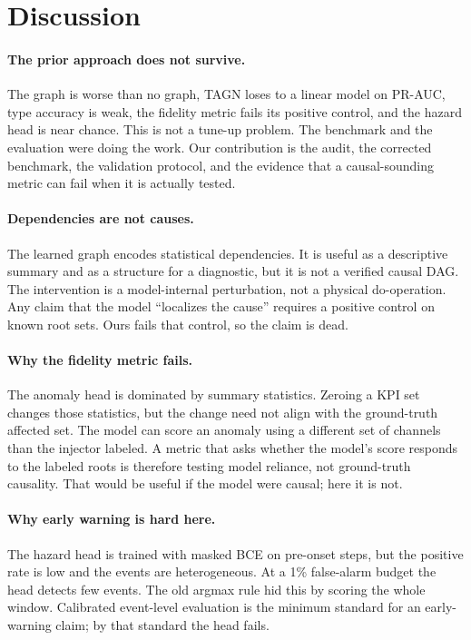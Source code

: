 \documentclass[conference]{IEEEtran}
\begin{document}
\section{Discussion}

\paragraph{The prior approach does not survive.}
The graph is worse than no graph, TAGN loses to a linear model on PR-AUC, type accuracy is weak, the fidelity metric fails its positive control, and the hazard head is near chance. This is not a tune-up problem. The benchmark and the evaluation were doing the work. Our contribution is the audit, the corrected benchmark, the validation protocol, and the evidence that a causal-sounding metric can fail when it is actually tested.

\paragraph{Dependencies are not causes.}
The learned graph encodes statistical dependencies. It is useful as a descriptive summary and as a structure for a diagnostic, but it is not a verified causal DAG. The intervention is a model-internal perturbation, not a physical do-operation. Any claim that the model ``localizes the cause'' requires a positive control on known root sets. Ours fails that control, so the claim is dead.

\paragraph{Why the fidelity metric fails.}
The anomaly head is dominated by summary statistics. Zeroing a KPI set changes those statistics, but the change need not align with the ground-truth affected set. The model can score an anomaly using a different set of channels than the injector labeled. A metric that asks whether the model's score responds to the labeled roots is therefore testing model reliance, not ground-truth causality. That would be useful if the model were causal; here it is not.

\paragraph{Why early warning is hard here.}
The hazard head is trained with masked BCE on pre-onset steps, but the positive rate is low and the events are heterogeneous. At a 1\% false-alarm budget the head detects few events. The old argmax rule hid this by scoring the whole window. Calibrated event-level evaluation is the minimum standard for an early-warning claim; by that standard the head fails.
\end{document}
